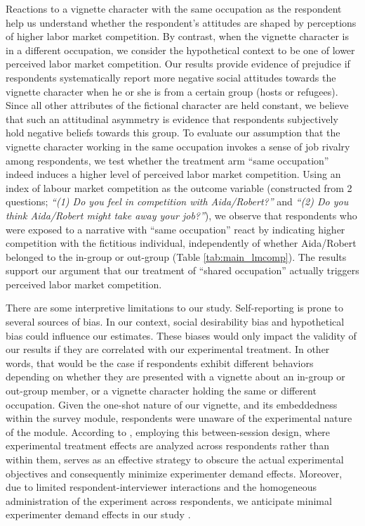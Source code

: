 \documentclass[a4paper,12pt]{article}
\begin{document}
Reactions to a vignette character with the same occupation as the respondent help us understand whether the respondent's attitudes are shaped by perceptions of higher labor market competition. By contrast, when the vignette character is in a different occupation, we consider the hypothetical context to be one of lower perceived labor market competition. Our results provide evidence of prejudice if respondents systematically report more negative social attitudes towards the vignette character when he or she is from a certain group (hosts or refugees). Since all other attributes of the fictional character are held constant, we believe that such an attitudinal asymmetry is evidence that respondents subjectively hold negative beliefs towards this group. To evaluate our assumption that the vignette character working in the same occupation invokes a sense of job rivalry among respondents, we test whether the treatment arm ``same occupation'' indeed induces a higher level of perceived labor market competition. Using an index of labour market competition as the outcome variable (constructed from 2 questions; \textit{``(1) Do you feel in competition with Aida/Robert?''} and \textit{``(2) Do you think Aida/Robert might take away your job?''}), we observe that respondents who were exposed to a narrative with ``same occupation'' react by indicating higher competition with the fictitious individual, independently of whether Aida/Robert belonged to the in-group or out-group (Table \ref{tab:main_lmcomp}). The results support our argument that our treatment of ``shared occupation'' actually triggers perceived labor market competition.

 
There are some interpretive limitations to our study. Self-reporting is prone to several sources of bias. In our context, social desirability bias and hypothetical bias \citep{schwarz1999self} could influence our estimates. These biases would only impact the validity of our results if they are correlated with our experimental treatment. In other words, that would be the case if respondents exhibit different behaviors depending on whether they are presented with a vignette about an in-group or out-group member, or a vignette character holding the same or different occupation. Given the one-shot nature of our vignette, and its embeddedness within the survey module, respondents were unaware of the experimental nature of the module. According to \cite{zizzo2010experimenter}, employing this between-session design, where experimental treatment effects are analyzed across respondents rather than within them, serves as an effective strategy to obscure the actual experimental objectives and consequently minimize experimenter demand effects. Moreover, due to limited respondent-interviewer interactions and the homogeneous administration of the experiment across respondents, we anticipate minimal experimenter demand effects in our study \citep{de2019experimenter}.
\end{document}
